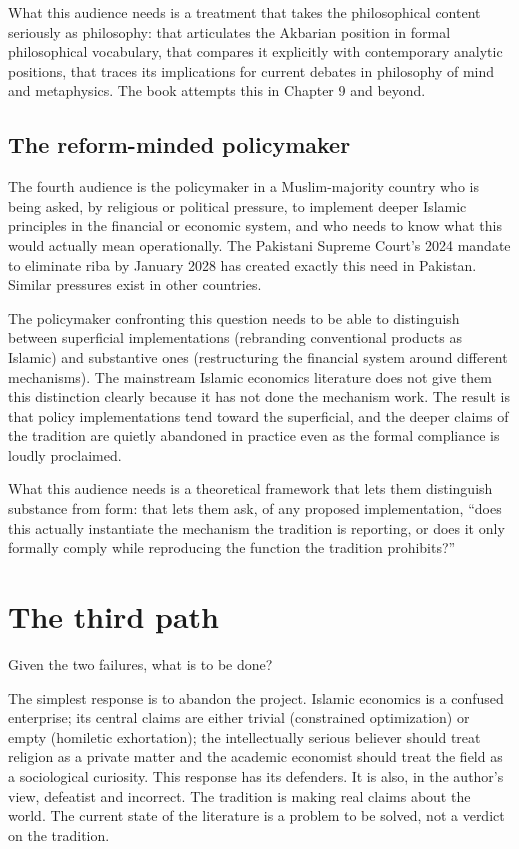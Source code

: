 What this audience needs is a treatment that takes the philosophical
content seriously as philosophy: that articulates the Akbarian
position in formal philosophical vocabulary, that compares it
explicitly with contemporary analytic positions, that traces its
implications for current debates in philosophy of mind and
metaphysics. The book attempts this in Chapter 9 and beyond.

\subsection{The reform-minded policymaker}

The fourth audience is the policymaker in a Muslim-majority country
who is being asked, by religious or political pressure, to implement
deeper Islamic principles in the financial or economic system, and
who needs to know what this would actually mean operationally. The
Pakistani Supreme Court's 2024 mandate to eliminate riba by January
2028 has created exactly this need in Pakistan. Similar pressures
exist in other countries.

The policymaker confronting this question needs to be able to
distinguish between superficial implementations (rebranding
conventional products as Islamic) and substantive ones (restructuring
the financial system around different mechanisms). The mainstream
Islamic economics literature does not give them this distinction
clearly because it has not done the mechanism work. The result is
that policy implementations tend toward the superficial, and the
deeper claims of the tradition are quietly abandoned in practice
even as the formal compliance is loudly proclaimed.

What this audience needs is a theoretical framework that lets them
distinguish substance from form: that lets them ask, of any
proposed implementation, ``does this actually instantiate the
mechanism the tradition is reporting, or does it only formally
comply while reproducing the function the tradition prohibits?''

\section{The third path}
\label{sec:third-path}

Given the two failures, what is to be done?

The simplest response is to abandon the project. Islamic economics
is a confused enterprise; its central claims are either trivial
(constrained optimization) or empty (homiletic exhortation); the
intellectually serious believer should treat religion as a private
matter and the academic economist should treat the field as a
sociological curiosity. This response has its defenders. It is also,
in the author's view, defeatist and incorrect. The tradition is
making real claims about the world. The current state of the
literature is a problem to be solved, not a verdict on the
tradition.

